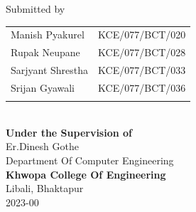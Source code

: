 \begin{center}
		\vspace{0.2in}
		\large{Submitted by}\\
		\begin{tabular}{p{3.5in}p{2in}}
			\hspace{0.3cm}Manish Pyakurel& KCE/077/BCT/020\\
			\hspace{0.3cm}Rupak Neupane& KCE/077/BCT/028\\
			\hspace{0.3cm}Sarjyant Shrestha& KCE/077/BCT/033\\
			\hspace{0.3cm}Srijan Gyawali& KCE/077/BCT/036\\
		 \vspace{0.2in}
		\end{tabular}
		\\
		\vspace{1cm}
		\large{\textbf{Under the Supervision of}\\}
			\normalsize{Er.Dinesh Gothe\\
				Department Of Computer Engineering\\
			}
			\vspace{1cm}
		\large{\textbf{Khwopa College Of Engineering}\\}
			\normalsize{Libali, Bhaktapur\\
			2023-00
		}
    \end{center}
